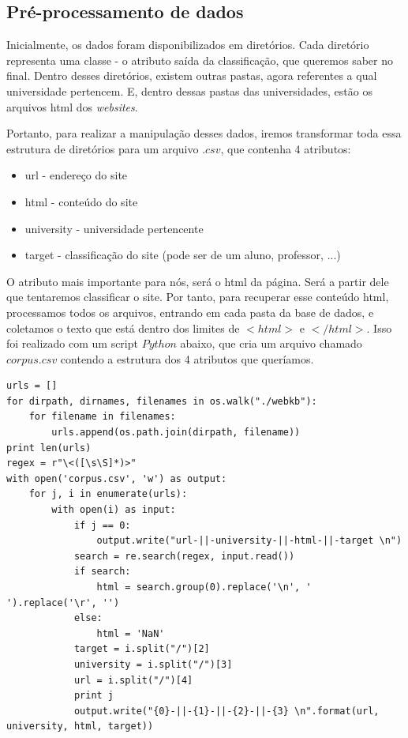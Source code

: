\documentclass [12pt, a4paper] {article}
\begin{document}
\subsection{Pré-processamento de dados}

Inicialmente, os dados foram disponibilizados em diretórios. Cada diretório representa uma classe - o atributo saída da classificação, que queremos saber no final. Dentro desses diretórios, existem outras pastas, agora referentes a qual universidade pertencem. E, dentro dessas pastas das universidades, estão os arquivos html dos \textit{websites}.

Portanto, para realizar a manipulação desses dados, iremos transformar toda essa estrutura de diretórios para um arquivo $.csv$, que contenha 4 atributos: 
\begin{itemize}
\item url - endereço do site
\item html - conteúdo do site
\item university - universidade pertencente
\item target - classificação do site (pode ser de um aluno, professor, ...)
\end{itemize}

O atributo mais importante para nós, será o html da página. Será a partir dele que tentaremos classificar o site. Por tanto, para recuperar esse conteúdo html, processamos todos os arquivos, entrando em cada pasta da base de dados, e coletamos o texto que está dentro dos limites de $<html>$ e $</html>$. Isso foi realizado com um script $Python$ abaixo, que cria um arquivo chamado $corpus.csv$ contendo a estrutura dos 4 atributos que queríamos. \\


\begin{lstlisting}
urls = []
for dirpath, dirnames, filenames in os.walk("./webkb"):
    for filename in filenames:
        urls.append(os.path.join(dirpath, filename))
print len(urls)
regex = r"\<([\s\S]*)>"
with open('corpus.csv', 'w') as output:
    for j, i in enumerate(urls):
        with open(i) as input:
            if j == 0:
                output.write("url-||-university-||-html-||-target \n")
            search = re.search(regex, input.read())
            if search: 
                html = search.group(0).replace('\n', ' ').replace('\r', '')
            else:
                html = 'NaN'
            target = i.split("/")[2]
            university = i.split("/")[3]
            url = i.split("/")[4]
            print j
            output.write("{0}-||-{1}-||-{2}-||-{3} \n".format(url, university, html, target))
\end{lstlisting}
\end{document}
